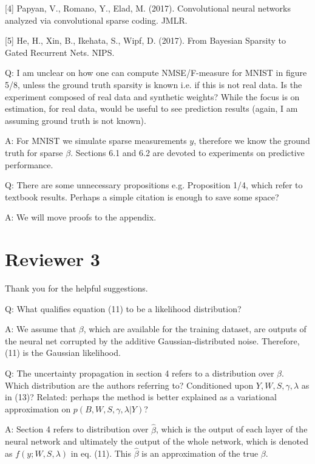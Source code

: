 \documentclass{article}
\begin{document}
[4] Papyan, V., Romano, Y., Elad, M. (2017). Convolutional neural networks analyzed via convolutional sparse coding. JMLR.

[5] He, H., Xin, B., Ikehata, S., Wipf, D. (2017). From Bayesian Sparsity to Gated Recurrent Nets. NIPS.
\newline
\newline

Q: I am unclear on how one can compute NMSE/F-measure for MNIST in figure 5/8, unless the ground truth sparsity is known i.e. if this is not real data. Is the experiment composed of real data and synthetic weights? While the focus is on estimation, for real data, would be useful to see prediction results (again, I am assuming ground truth is not known).

A: For MNIST we simulate sparse measurements $y$, therefore we know the ground truth for sparse $\beta$. Sections 6.1 and 6.2 are devoted to experiments on predictive performance.
\newline
\newline

Q: There are some unnecessary propositions e.g. Proposition 1/4, which refer to textbook results. Perhaps a simple citation is enough to save some space?

A: We will move proofs to the appendix.

\section*{Reviewer 3}
Thank you for the helpful suggestions.

Q: What qualifies equation (11) to be a likelihood distribution?

A: We assume that $\beta$, which are available for the training dataset, are outputs of the neural net corrupted by the additive Gaussian-distributed noise. Therefore, (11) is the Gaussian likelihood.
\newline
\newline

Q: The uncertainty propagation in section 4 refers to a distribution over $\beta$. Which distribution are the authors referring to? Conditioned upon $Y,W,S,\gamma,\lambda$ as in (13)? Related: perhaps the method is better explained as a variational approximation on $p(B,W,S,\gamma,\lambda|Y)$?

A: Section 4 refers to distribution over $\widehat{\beta}$, which is the output of each layer of the neural network and ultimately the output of the whole network, which is denoted as $f(y; W, S, \lambda)$ in eq. (11). This $\widehat{\beta}$ is an approximation of the true $\beta$.
\end{document}
